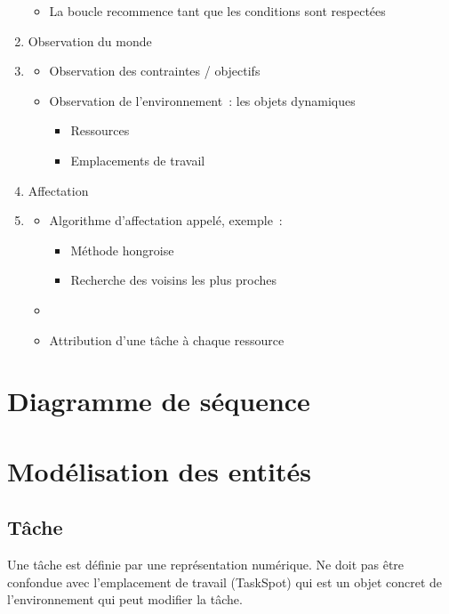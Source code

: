 \begin{enumerate}
\begin{itemize}
	\item La boucle recommence tant que les conditions sont respectées
	\end{itemize}
%
\item Observation du monde
\item[]
	\begin{itemize}
	\setlength{\itemsep}{5pt}
	\item Observation des contraintes / objectifs
	\item Observation de l'environnement~: les objets dynamiques
		\begin{itemize}
		\setlength{\itemsep}{2pt}
		\item Ressources
		\item Emplacements de travail
		\end{itemize}
	\end{itemize}
%
\item Affectation
\item[]
	\begin{itemize}
	\setlength{\itemsep}{5pt}
	\item Algorithme d'affectation appelé, exemple~:
		\begin{itemize}
		\setlength{\itemsep}{2pt}
		\item Méthode hongroise
		\item Recherche des voisins les plus proches
		\end{itemize}
		\item %
	\item Attribution d'une tâche à chaque ressource
	\end{itemize}
\end{enumerate} %

%
\section{Diagramme de séquence}

%
\section{Modélisation des entités}

\subsection*{Tâche}

Une tâche est définie par une représentation numérique. Ne doit pas être confondue avec l'emplacement de travail (TaskSpot) qui est un objet concret de l'environnement qui peut modifier la  tâche.

